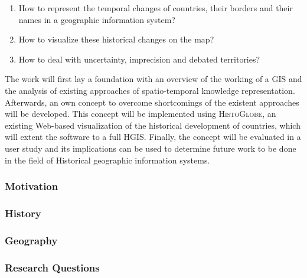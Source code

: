 \begin{enumerate}
  \item How to represent the temporal changes of countries, their borders and their names in a geographic information system?
  \item How to visualize these historical changes on the map?
  \item How to deal with uncertainty, imprecision and debated territories?
\end{enumerate}

The work will first lay a foundation with an overview of the working of a GIS and the analysis of existing approaches of spatio-temporal knowledge representation. Afterwards, an own concept to overcome shortcomings of the existent approaches will be developed. This concept will be implemented using \textsc{HistoGlobe}, an existing Web-based visualization of the historical development of countries, which will extent the software to a full HGIS. Finally, the concept will be evaluated in a user study and its implications can be used to determine future work to be done in the field of Historical geographic information systems.

\subsubsection{Motivation} %
\label{ssub:motivation}



\subsubsection{History} %
\label{ssub:history}



\subsubsection{Geography} %
\label{ssub:geography}



\subsubsection{Research Questions} %
\label{ssub:research_questions}





